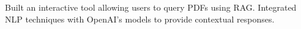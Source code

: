   {Built an interactive tool allowing users to query PDFs using RAG. Integrated NLP techniques with OpenAI's models to provide contextual responses.}
